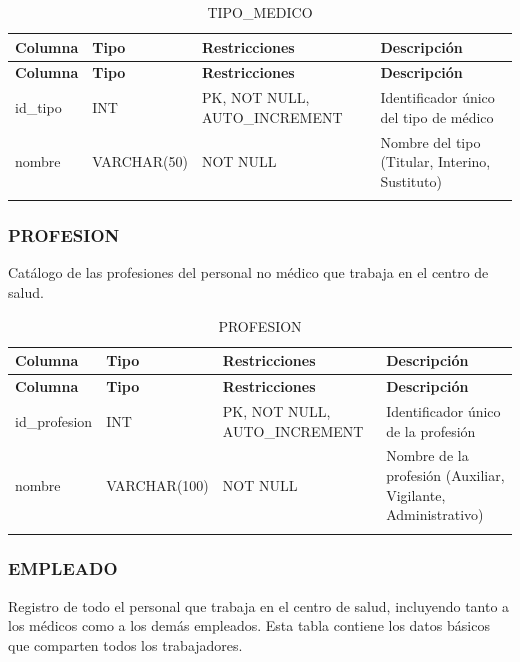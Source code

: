 \documentclass[12pt,a4paper]{article}
\begin{document}
{\small\begin{longtable}{|p{2.3cm}|p{3.3cm}|p{4.2cm}|p{4.2cm}|}
\hline
\textbf{Columna} & \textbf{Tipo} & \textbf{Restricciones} & \textbf{Descripci\'on} \\ \hline
\endfirsthead
\hline
\textbf{Columna} & \textbf{Tipo} & \textbf{Restricciones} & \textbf{Descripci\'on} \\ \hline
\endhead
id\_tipo & INT & PK, NOT NULL, AUTO\_INCREMENT & Identificador \'unico del tipo de m\'edico \\ \hline
nombre & VARCHAR(50) & NOT NULL & Nombre del tipo (Titular, Interino, Sustituto) \\ \hline
\caption{TIPO\_MEDICO}
\end{longtable}}

\subsubsection{PROFESION}
Cat\'alogo de las profesiones del personal no m\'edico que trabaja en el centro de salud.

{\small\begin{longtable}{|p{2.3cm}|p{3.3cm}|p{4.2cm}|p{4.2cm}|}
\hline
\textbf{Columna} & \textbf{Tipo} & \textbf{Restricciones} & \textbf{Descripci\'on} \\ \hline
\endfirsthead
\hline
\textbf{Columna} & \textbf{Tipo} & \textbf{Restricciones} & \textbf{Descripci\'on} \\ \hline
\endhead
id\_profesion & INT & PK, NOT NULL, AUTO\_INCREMENT & Identificador \'unico de la profesi\'on \\ \hline
nombre & VARCHAR(100) & NOT NULL & Nombre de la profesi\'on (Auxiliar, Vigilante, Administrativo) \\ \hline
\caption{PROFESION}
\end{longtable}}

\subsubsection{EMPLEADO}
Registro de todo el personal que trabaja en el centro de salud, incluyendo tanto a los m\'edicos como a los dem\'as empleados. Esta tabla contiene los datos b\'asicos que comparten todos los trabajadores.
\end{document}
